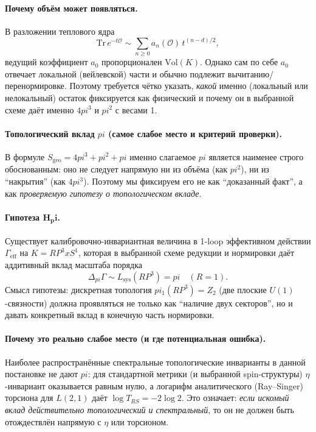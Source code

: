 \documentclass[12pt]{article}
\def\mathbb#1{#1}%
\def\pi{pi}%
\def\times{x}%
\begin{document}
\paragraph{Почему объём может появляться.}
В разложении теплового ядра
\begin{equation}
\mathrm{Tr}\,e^{-t\mathcal{O}}\sim \sum_{n\ge 0} a_n(\mathcal{O})\,t^{(n-d)/2},
\end{equation}
ведущий коэффициент $a_0$ пропорционален $\mathrm{Vol}(K)$.
Однако сам по себе $a_0$ отвечает локальной (вейлевской) части и обычно подлежит вычитанию/перенормировке.
Поэтому требуется чётко указать, \emph{какой} именно (локальный или нелокальный) остаток фиксируется как физический и почему он в выбранной схеме даёт именно $4\pi^3$ и $\pi^2$ с весами 1.

\paragraph{Топологический вклад $\pi$ (самое слабое место и критерий проверки).}
В формуле $S_{\mathrm{geo}}=4\pi^3+\pi^2+\pi$ именно слагаемое $\pi$ является наименее строго обоснованным: оно не следует напрямую ни из объёма (как $\pi^2$), ни из ``накрытия'' (как $4\pi^3$).
Поэтому мы фиксируем его не как ``доказанный факт'', а как \emph{проверяемую гипотезу о топологическом вкладе}.

\paragraph{Гипотеза $\mathbf{H_\pi}$.}
Существует калибровочно-инвариантная величина в 1-loop эффективном действии $\Gamma_{\mathrm{eff}}$ на $K=\mathbb{RP}^3\times S^1$, которая в выбранной схеме редукции и нормировки даёт аддитивный вклад масштаба порядка
\begin{equation}
\Delta_{\pi}\Gamma\sim L_{\mathrm{sys}}(\mathbb{RP}^3)=\pi\quad (R=1).
\end{equation}
Смысл гипотезы: дискретная топология $\pi_1(\mathbb{RP}^3)=\mathbb{Z}_2$ (две плоские $U(1)$-связности) должна проявляться не только как ``наличие двух секторов'', но и давать конкретный вклад в конечную часть нормировки.

\paragraph{Почему это реально слабое место (и где потенциальная ошибка).}
Наиболее распространённые спектральные топологические инварианты в данной постановке не дают $\pi$:
для стандартной метрики (и выбранной spin-структуры) $\eta$-инвариант оказывается равным нулю, а логарифм аналитического (Ray--Singer) торсиона для $L(2,1)$ даёт $\log T_{RS}=-2\log 2$.
Это означает: \emph{если искомый вклад действительно топологический и спектральный}, то он не должен быть отождествлён напрямую с $\eta$ или торсионом.
\end{document}
